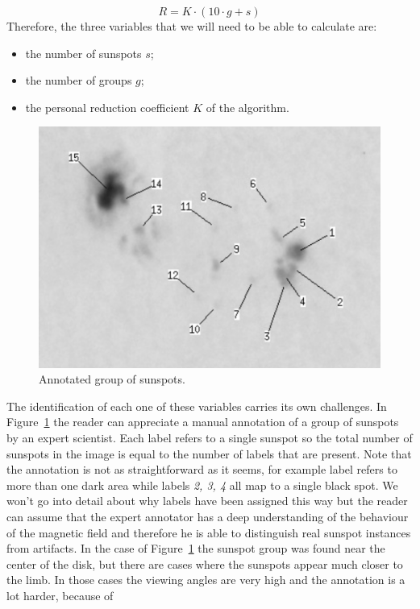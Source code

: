 \begin{equation}
  R = K \cdot (10 \cdot g + s)
\end{equation}
Therefore, the three variables that we will need to be able to calculate are:
\begin{itemize}
  \item the number of sunspots $s$;
  \item the number of groups $g$;
  \item the personal reduction coefficient $K$ of the algorithm.
\end{itemize}
\begin{figure}[b!]
    \centering
    \includegraphics[width=\textwidth]{./pictures/sunspot-annotation}
    \caption{Annotated group of sunspots.}
    \label{fig:sunspot-annotation}
\end{figure}
The identification of each one of these variables carries its own challenges. In Figure~\ref{fig:sunspot-annotation} the reader can appreciate a manual annotation of a group of sunspots by an expert scientist. Each label refers to a single sunspot so the total number of sunspots in the image is equal to the number of labels that are present. Note that the annotation is not as straightforward as it seems, for example label  refers to more than one dark area while labels \textit{2, 3, 4} all map to a single black spot. We won't go into detail about why labels have been assigned this way but the reader can assume that the expert annotator has a deep understanding of the behaviour of the magnetic field and therefore he is able to distinguish real sunspot instances from artifacts. In the case of Figure~\ref{fig:sunspot-annotation} the sunspot group was found near the center of the disk, but there are cases where the sunspots appear much closer to the limb. In those cases the viewing angles are very high and the annotation is a lot harder, because of
